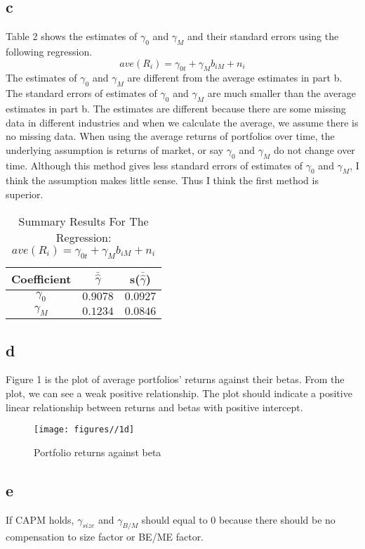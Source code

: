 \documentclass{report}
\begin{document}
\subsection{c}
Table 2 shows the estimates of $\gamma_{0}$ and $\gamma_{M}$ and their standard errors using the following regression.
\[  ave(R_{i}) = \gamma_{0t} + \gamma_{M}b_{iM} +n_{i} \]
The estimates of $\gamma_{0}$ and $\gamma_{M}$ are different from the average estimates in part b. The standard errors of estimates of $\gamma_{0}$ and $\gamma_{M}$ are much smaller than the average estimates in part b. The estimates are different because there are some missing data in different industries and when we calculate the average, we assume there is no missing data. When using the average returns of portfolios over time, the underlying assumption is returns of market, or say $\gamma_{0}$ and $\gamma_{M}$ do not change over time. Although this method gives less standard errors of estimates of $\gamma_{0}$ and $\gamma_{M}$, I think the assumption makes little sense. Thus I think the first method is superior.
\begin{table}[H]
\centering
\begin{tabular}{|c|c|c|}
\hline
Coefficient& $\bar{\hat{\gamma}}$ & s($\bar{\hat{\gamma}}$) \\
\hline
$\gamma_{0}$ & $0.9078$ & $0.0927$ \\
\hline
$\gamma_{M}$ & $0.1234$ & $0.0846$ \\
\hline
\end{tabular}
\caption{ Summary Results For The Regression:  $ave(R_{i}) = \gamma_{0t} + \gamma_{M}b_{iM} +n_{i}$}
\end{table}


\subsection{d}
Figure 1 is the plot of average portfolios' returns against their betas. From the plot, we can see a weak positive relationship. The plot should indicate a positive linear relationship between returns and betas with positive intercept.
\begin{figure}[H]
        \centering 
         \texttt{[image: figures//1d]}
         \caption{ Portfolio returns against beta}
\end{figure}

\subsection{e}
If CAPM holds, $\gamma_{size}$ and $\gamma_{B/M}$ should equal to 0 because there should be no compensation to size factor or BE/ME factor.
\end{document}
